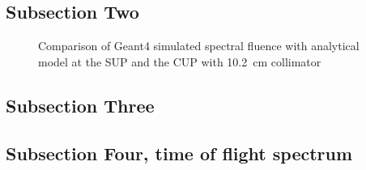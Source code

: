 \documentclass[12pt,journal]{IEEEtran}
\let\MYoriglatexcaption\caption
\renewcommand{\caption}[2][\relax]{\MYoriglatexcaption[#2]{#2}}
\begin{document}
\subsection{Subsection Two}
\begin{figure}[!t]
	\centering
	\hfil
	\caption{Comparison of Geant4 simulated spectral fluence with analytical model at the SUP and the CUP with \SI{10.2}{\cm} collimator~\cite{Prokofiev2009,Prokofiev14}}
	\label{fig:NYieldComparedSUPCUP10}
\end{figure}

\subsection{Subsection Three}


\subsection{Subsection Four, time of flight spectrum}
\end{document}
